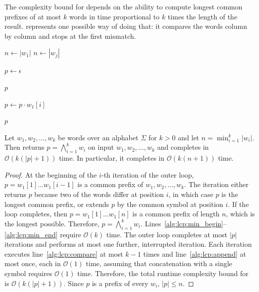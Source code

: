The complexity bound for  depends on the ability to compute
longest common prefixes of at most $k$ words in time proportional to $k$ times the
length of the result.  represents one possible way of doing that: it
compares the words column by column and stops at the first mismatch.

\begin{algorithm}[ht]
  \DontPrintSemicolon

  $n \gets |w_1|$\;
   {
     {
      $n \gets |w_j|$\;
    }
  }

  $p \gets \epsilon$\;
   {
     {
       {
        \Return $p$
      }
    }

    $p \gets p \cdot w_1[i]$\;
  }

  \Return $p$

  \caption{Longest common prefix of $k$ words.}
  \label{alg:lcp}
\end{algorithm}

\begin{proposition}\label{prop:lcp_complexity}
  Let $w_1, w_2, \ldots, w_k$ be words over an alphabet $\Sigma$ for $k > 0$ and let
  $n = \min_{i=1}^k |w_i|$. Then  returns $p = \bigwedge_{i=1}^k w_i$
  on input $w_1, w_2, \ldots, w_k$ and completes in $\mathcal{O}(k(|p| + 1))$ time.
  In particular, it completes in $\mathcal{O}(k(n + 1))$ time.
\end{proposition}

\begin{proof}
  At the beginning of the $i$-th iteration of the outer loop, $p = w_1[1] \ldots
  w_1[i-1]$ is a common prefix of $w_1, w_2, \ldots, w_k$. The iteration either
  returns $p$ because two of the words differ at position $i$, in which case $p$ is
  the longest common prefix, or extends $p$ by the common symbol at position $i$. If
  the loop completes, then $p = w_1[1] \ldots w_1[n]$ is a common prefix of length
  $n$, which is the longest possible. Therefore, $p = \bigwedge_{i=1}^k w_i$.
  Lines~\ref{alg:lcp:min_begin}--\ref{alg:lcp:min_end} require $\mathcal{O}(k)$ time.
  The outer loop completes at most $|p|$ iterations and performs at most one further,
  interrupted iteration. Each iteration executes line~\ref{alg:lcp:compare} at most
  $k - 1$ times and line~\ref{alg:lcp:append} at most once, each in $\mathcal{O}(1)$
  time, assuming that concatenation with a single symbol requires $\mathcal{O}(1)$
  time. Therefore, the total runtime complexity bound for  is
  $\mathcal{O}(k(|p| + 1))$. Since $p$ is a prefix of every $w_i$, $|p| \leq n$.
\end{proof}

